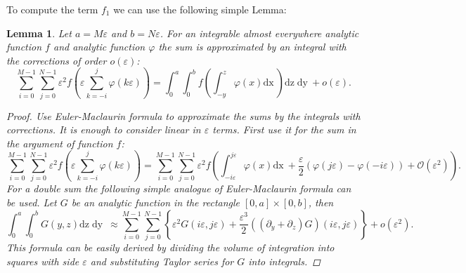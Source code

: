 \documentclass{article}
\newtheorem{lemma}{Lemma}
\newcommand{\dx}{\mathrm{dx}~}
\newcommand{\dy}{\mathrm{dy}~}
\newcommand{\dz}{\mathrm{dz}}
\begin{document}
To compute the term $f_{1}$ we can use the following simple Lemma:
\begin{lemma}
  Let $a=M\varepsilon$ and $b=N\varepsilon$.
  For an integrable almost everywhere analytic function $f$ and analytic function $\varphi$ the sum is approximated by
  an integral with the corrections  of order $o(\varepsilon)$:
  \begin{equation}
    \label{eq:75}
    \sum_{i=0}^{M-1}\sum_{j=0}^{N-1}\varepsilon^{2}f\left(\varepsilon\sum_{k=-i}^{j}\varphi(k\varepsilon)\right)=
    \int_{0}^{a}\int_{0}^{b}f\left(\int_{-y}^{z}\varphi(x)\dx\right)\dz\;\dy+o(\varepsilon).
  \end{equation}
\begin{proof}
  Use Euler-Maclaurin formula to approximate the sums by the integrals with corrections. It is
  enough to consider linear in $\varepsilon$ terms. First use
  it for the sum in the argument of function $f$:
  \begin{equation}
    \label{eq:76}
    \sum_{i=0}^{M-1}\sum_{j=0}^{N-1}\varepsilon^{2}f\left(\varepsilon\sum_{k=-i}^{j}\varphi(k\varepsilon)\right)=
    \sum_{i=0}^{M-1}\sum_{j=0}^{N-1}\varepsilon^{2}f\left(\int_{-i\varepsilon}^{j\varepsilon}\varphi(x)\dx+\frac{\varepsilon}{2}\left(\varphi(j\varepsilon)-\varphi(-i\varepsilon)\right)+\mathcal{O}(\varepsilon^{2})\right).
  \end{equation}
  For a double sum the following simple analogue of Euler-Maclaurin formula can be used. 
Let $G$ be an analytic function in the rectangle $[0,a]\times[0,b]$, then
\begin{equation}
  \label{eq:77}
  \int_{0}^{a} \int_{0}^{b}G(y,z) \dz\; \dy\;
  \approx\sum_{i=0}^{M-1}\sum_{j=0}^{N-1}\left\{\varepsilon^{2}G\left(i\varepsilon,j\varepsilon\right)+
    \frac{\varepsilon^{3}}{2}\left((\partial_{y}+\partial_{z})G\right)(i\varepsilon,j\varepsilon)\right\}+o(\varepsilon^{2}).
\end{equation}
This formula can be easily derived by dividing the volume of integration into squares with side
$\varepsilon$ and substituting Taylor series for $G$ into integrals.


\end{proof}
\end{lemma}
\end{document}
